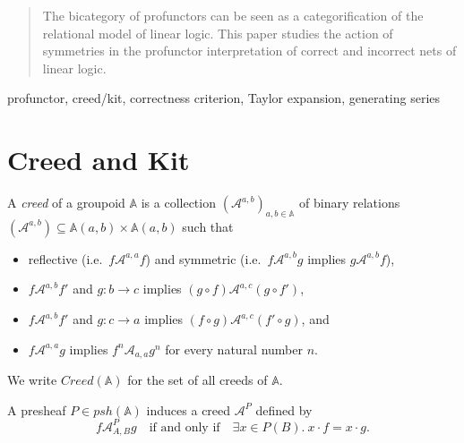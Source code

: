 \documentclass[conference]{IEEEtran}
\theoremstyle{plain}
\theoremstyle{definition}
\theoremstyle{remark}
\begin{document}
\begin{abstract}
    The bicategory of profunctors can be seen as a categorification of the relational model of linear logic.
    This paper studies the action of symmetries in the profunctor interpretation of correct and incorrect nets of linear logic.
\end{abstract}

\begin{IEEEkeywords}
    profunctor, creed/kit, correctness criterion, Taylor expansion, generating series
\end{IEEEkeywords}

\newcommand{\creed}{\mathcal{A}}
\newcommand{\creedb}{\mathcal{B}}
\newcommand{\creedc}{\mathcal{C}}
\newcommand{\Creed}{\mathit{Creed}}
\newcommand{\Grp}{\mathbb{A}}
\newcommand{\Grpb}{\mathbb{B}}
\newcommand{\Grpc}{\mathbb{C}}

\newcommand{\kit}{\mathcal{A}}
\newcommand{\kitb}{\mathcal{B}}
\newcommand{\kitc}{\mathcal{C}}


\section{Creed and Kit}
A \emph{creed} of a groupoid \( \Grp \) is a collection \( (\creed^{a,b})_{a,b \in \Grp} \) of binary relations \( ({\creed^{a,b}}) \subseteq \Grp(a,b) \times \Grp(a,b) \) such that
\begin{itemize}
    \item reflective (i.e.~\( f \creed^{a,a} f \)) and symmetric (i.e.~\( f \creed^{a,b} g \) implies \( g \creed^{a,b} f \)),
    \item \( f \creed^{a,b} f' \) and \( g \colon b \longrightarrow c \) implies \( (g \circ f) \creed^{a,c} (g \circ f') \),
    \item \( f \creed^{a,b} f' \) and \( g \colon c \longrightarrow a \) implies \( (f \circ g) \creed^{a,c} (f' \circ g) \), and
    \item \( f \creed^{a,a} g \) implies \( f^n \creed_{a,a} g^n \) for every natural number \( n \).
\end{itemize}
We write \( \Creed(\Grp) \) for the set of all creeds of \( \Grp \).

A presheaf \( P \in \mathit{psh}(\Grp) \) induces a creed \( \creed^P \) defined by
\begin{equation*}
    f \creed^P_{A,B} g
    \quad\mbox{if and only if}\quad
    \exists x \in P(B).\: x \cdot f = x \cdot g.
\end{equation*}
\end{document}
